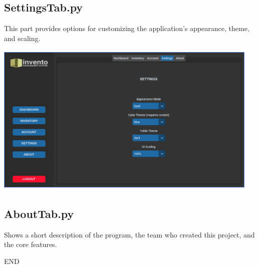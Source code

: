 \documentclass[12pt,a4paper]{article}
\renewcommand{\indent}{\hspace\parindent}
\begin{document}
        \subsection*{\normalfont{\faCode{}} \textbf{SettingsTab.py}}

            \indent This part provides options for customizing the application's 
            appearance, theme, and scaling.

            \begin{center}
                \includegraphics[width=5in,height=2.9in]{Settings.png}
            \end{center}

        \subsection*{\normalfont{\faCode{}} \textbf{AboutTab.py}}

            \indent Shows a short description of the program, the team who created this 
            project, and the core features.

        \hfill{}

        \noindent\dotfill{} END \dotfill

\end{document}
